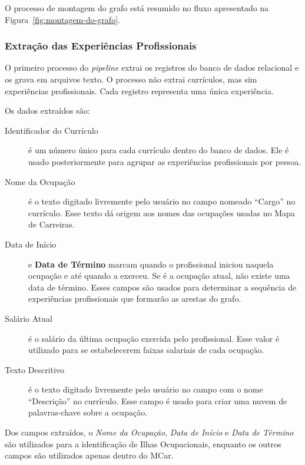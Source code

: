\documentclass[12pt,a4paper]{article}
\begin{document}
O processo de montagem do grafo está resumido no fluxo apresentado na Figura~\ref{fig:montagem-do-grafo}.


\subsubsection{Extração das Experiências Profissionais} \label{sec:extracao-experiencia}

O primeiro processo do \textit{pipeline} extrai os registros do banco de dados relacional e os grava em arquivos texto. O processo não extrai currículos, mas sim experiências profissionais. Cada registro representa uma única experiência.

Os dados extraídos são:

\begin{description}

  \item[Identificador do Currículo] é um número único para cada currículo dentro do banco de dados. Ele é usado posteriormente para agrupar as experiências profissionais por pessoa.

  \item[Nome da Ocupação] é o texto digitado livremente pelo usuário no campo nomeado \enquote{Cargo} no currículo. Esse texto dá origem aos nomes das ocupações usadas no Mapa de Carreiras.

  \item[Data de Início] e \textbf{Data de Término} marcam quando o profissional iniciou naquela ocupação e até quando a exerceu. Se é a ocupação atual, não existe uma data de término. Esses campos são usados para determinar a sequência de experiências profissionais que formarão as arestas do grafo.

  \item[Salário Atual] é o salário da última ocupação exercida pelo profissional. Esse valor é utilizado para se estabelecerem faixas salariais de cada ocupação.

  \item[Texto Descritivo] é o texto digitado livremente pelo usuário no campo com o nome \enquote{Descrição} no currículo. Esse campo é usado para criar uma nuvem de palavras-chave sobre a ocupação.
\end{description}

Dos campos extraídos, o \textit{Nome da Ocupação}, \textit{Data de Início} e \textit{Data de Término} são utilizados para a identificação de Ilhas Ocupacionais, enquanto os outros campos são utilizados apenas dentro do MCar.
\end{document}
